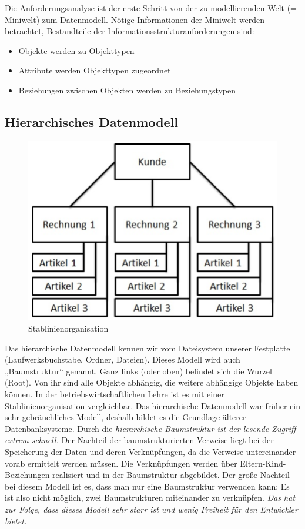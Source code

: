 Die Anforderungsanalyse ist der erste Schritt von der zu modellierenden Welt (= Miniwelt) zum Datenmodell. Nötige Informationen der Miniwelt werden betrachtet, Bestandteile der Informationsstrukturanforderungen sind:
\begin{itemize}
    \item Objekte werden zu Objekttypen
    \item Attribute werden Objekttypen zugeordnet
    \item Beziehungen zwischen Objekten werden zu Beziehungstypen
\end{itemize}

\subsection{Hierarchisches Datenmodell}

\begin{figure}
    \begin{center}
        \includegraphics[width=.34\textwidth]{Content/images/modellierung/stablinien.png}
    \end{center}
    \caption{Stablinienorganisation}
    \label{fig:modellierung:stablinien}
\end{figure}
Das hierarchische Datenmodell kennen wir vom Dateisystem unserer Festplatte (Laufwerksbuchstabe, Ordner, Dateien). Dieses Modell wird auch „Baumstruktur“ genannt. Ganz links (oder oben) befindet sich die Wurzel (Root). Von ihr sind alle Objekte abhängig, die weitere abhängige Objekte haben können. In der betriebswirtschaftlichen Lehre ist es mit einer Stablinienorganisation vergleichbar. Das hierarchische Datenmodell war früher ein sehr gebräuchliches Modell, deshalb bildet es die Grundlage älterer Datenbanksysteme.
 Durch die \emph{hierarchische Baumstruktur ist der lesende Zugriff extrem schnell.} Der Nachteil der baumstrukturierten Verweise liegt bei der Speicherung der Daten und deren Verknüpfungen, da die Verweise untereinander vorab ermittelt werden müssen. Die Verknüpfungen werden über Eltern-Kind-Beziehungen realisiert und in der Baumstruktur abgebildet. Der große Nachteil bei diesem Modell ist es, dass man nur eine Baumstruktur verwenden kann: Es ist also nicht möglich, zwei Baumstrukturen miteinander zu verknüpfen. \emph{Das hat zur Folge, dass dieses Modell sehr starr ist und wenig Freiheit für den Entwickler bietet. }

